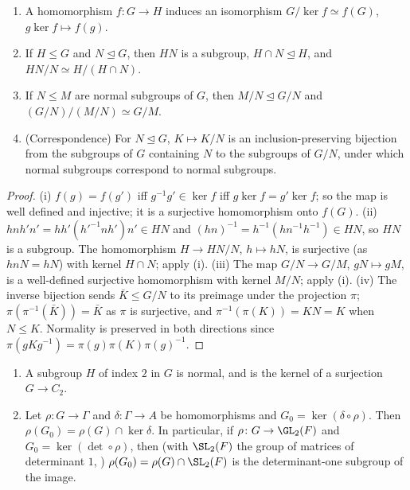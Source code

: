 \begin{theorem}\label{thm:groups:isothms}
\begin{enumerate}[label=(\roman*)]
\item A homomorphism $f\colon G\to H$ induces an isomorphism $G/\ker f\simeq f(G)$, $g\ker f\mapsto f(g)$.
\item If $H\le G$ and $N\trianglelefteq G$, then $HN$ is a subgroup, $H\cap N\trianglelefteq H$, and $HN/N\simeq H/(H\cap N)$.
\item If $N\le M$ are normal subgroups of $G$, then $M/N\trianglelefteq G/N$ and $(G/N)/(M/N)\simeq G/M$.
\item (Correspondence) For $N\trianglelefteq G$, $K\mapsto K/N$ is an inclusion-preserving bijection from the subgroups of $G$ containing $N$ to
the subgroups of $G/N$, under which normal subgroups correspond to normal subgroups.
\end{enumerate}
\end{theorem}

\begin{proof}
(i) $f(g)=f(g')$ iff $g^{-1}g'\in\ker f$ iff $g\ker f=g'\ker f$; so the map is well defined and injective; it is a surjective
homomorphism onto $f(G)$. (ii) $hnh'n'=hh'(h'^{-1}nh')n'\in HN$ and $(hn)^{-1}=h^{-1}(hn^{-1}h^{-1})\in HN$, so $HN$ is a subgroup. The
homomorphism $H\to HN/N$, $h\mapsto hN$, is surjective (as $hnN=hN$) with kernel $H\cap N$; apply (i). (iii) The map $G/N\to G/M$,
$gN\mapsto gM$, is a well-defined surjective homomorphism with kernel $M/N$; apply (i). (iv) The inverse bijection sends $\bar K\le G/N$ to
its preimage under the projection $\pi$; $\pi(\pi^{-1}(\bar K))=\bar K$ as $\pi$ is surjective, and $\pi^{-1}(\pi(K))=KN=K$ when $N\le K$.
Normality is preserved in both directions since $\pi(gKg^{-1})=\pi(g)\pi(K)\pi(g)^{-1}$.
\end{proof}

\begin{lemma}\label{lem:groups:index2}
\begin{enumerate}[label=(\roman*)]
\item A subgroup $H$ of index $2$ in $G$ is normal, and is the kernel of a surjection $G\to C_2$.
\item Let $\rho\colon G\to\Gamma$ and $\delta\colon\Gamma\to A$ be homomorphisms and $G_0=\ker(\delta\circ\rho)$. Then $\rho(G_0)=\rho(G)\cap\ker\delta$. In
particular, if $\rho\colon G\to\GL_2(F)$ and $G_0=\ker(\det\circ\rho)$, then (with $\SL_2(F)$ the group of matrices of determinant $1$,
) $\rho(G_0)=\rho(G)\cap\SL_2(F)$ is the determinant-one subgroup of the
image.
\end{enumerate}
\end{lemma}

